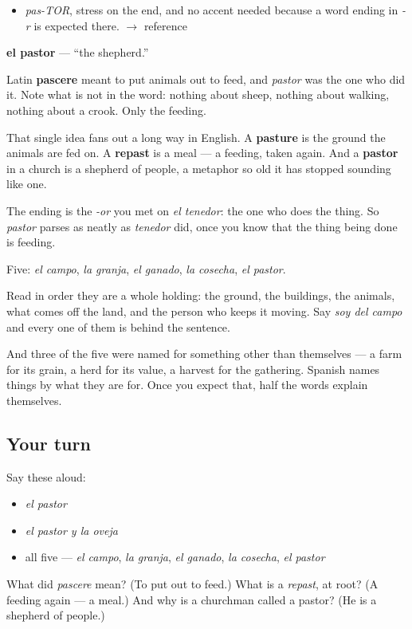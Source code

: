 \begin{sounds}
\begin{itemize}
\raggedright
  \item \emph{pas-TOR}, stress on the end, and no accent needed because a word ending in \emph{-r} is expected there. $\to$ reference
\end{itemize}
\end{sounds}

\begin{cousinweb}
\textbf{el pastor} — \textquotedblleft{}the shepherd.\textquotedblright{}

Latin \textbf{pascere} meant to put animals out to feed, and \emph{pastor} was the one who did it. Note what is not in the word: nothing about sheep, nothing about walking, nothing about a crook. Only the feeding.

That single idea fans out a long way in English. A \textbf{pasture} is the ground the animals are fed on. A \textbf{repast} is a meal — a feeding, taken again. And a \textbf{pastor} in a church is a shepherd of people, a metaphor so old it has stopped sounding like one.

The ending is the \emph{-or} you met on \emph{el tenedor}: the one who does the thing. So \emph{pastor} parses as neatly as \emph{tenedor} did, once you know that the thing being done is feeding.
\end{cousinweb}

\begin{grammarlens}[title={What you've built}]
Five: \emph{el campo}, \emph{la granja}, \emph{el ganado}, \emph{la cosecha}, \emph{el pastor}.

Read in order they are a whole holding: the ground, the buildings, the animals, what comes off the land, and the person who keeps it moving. Say \emph{soy del campo} and every one of them is behind the sentence.

And three of the five were named for something other than themselves — a farm for its grain, a herd for its value, a harvest for the gathering. Spanish names things by what they are for. Once you expect that, half the words explain themselves.
\end{grammarlens}

\subsection*{Your turn}
Say these aloud:

\begin{itemize}
\raggedright
  \item \emph{el pastor}
  \item \emph{el pastor y la oveja}
  \item all five — \emph{el campo}, \emph{la granja}, \emph{el ganado}, \emph{la cosecha}, \emph{el pastor}
\end{itemize}

\begin{tcolorbox}[breakable,colback=teal!4,colframe=teal!35!black,title={Before you move on}]
What did \emph{pascere} mean? (To put out to feed.) What is a \emph{repast}, at root? (A feeding again — a meal.) And why is a churchman called a pastor? (He is a shepherd of people.)
\end{tcolorbox}
